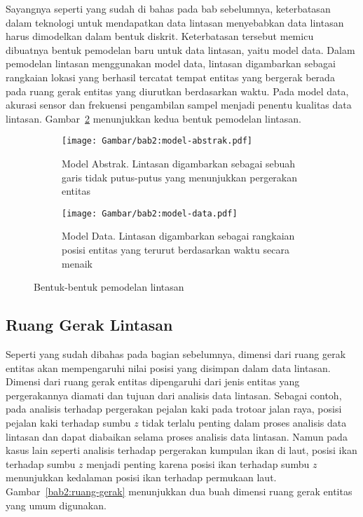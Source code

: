 Sayangnya seperti yang sudah di bahas pada bab sebelumnya, keterbatasan dalam teknologi untuk mendapatkan data lintasan menyebabkan data lintasan harus dimodelkan dalam bentuk diskrit. Keterbatasan tersebut memicu dibuatnya bentuk pemodelan baru untuk data lintasan, yaitu model data. Dalam pemodelan lintasan menggunakan model data, lintasan digambarkan sebagai rangkaian lokasi yang berhasil tercatat tempat entitas yang bergerak berada pada ruang gerak entitas yang diurutkan berdasarkan waktu. Pada model data, akurasi sensor dan frekuensi pengambilan sampel menjadi penentu kualitas data lintasan. Gambar~\ref{bab2:pemodelan-lintasan} menunjukkan kedua bentuk pemodelan lintasan.

\iffalse 

\lionov{kasih jarak antara gambar kiri dan kanan}.

\fi

\begin{figure}[t]
    \centering
    \begin{subfigure}[b]{0.375\textwidth}
        \centering
        \texttt{[image: Gambar/bab2:model-abstrak.pdf]}
        \caption{Model Abstrak. Lintasan digambarkan sebagai sebuah garis tidak putus-putus yang menunjukkan pergerakan entitas}
        \label{bab2:model-abstrak}
    \end{subfigure} \hspace{1.25cm}
    \begin{subfigure}[b]{0.375\textwidth}
        \centering
        \texttt{[image: Gambar/bab2:model-data.pdf]}
        \caption{Model Data. Lintasan digambarkan sebagai rangkaian posisi entitas yang terurut berdasarkan waktu secara menaik}
    \end{subfigure}
    \caption{Bentuk-bentuk pemodelan lintasan}
    \label{bab2:pemodelan-lintasan}
\end{figure}

\subsection{Ruang Gerak Lintasan}
\label{subsec:ruang}

Seperti yang sudah dibahas pada bagian sebelumnya, dimensi dari ruang gerak entitas akan mempengaruhi nilai posisi yang disimpan dalam data lintasan. Dimensi dari ruang gerak entitas dipengaruhi dari jenis entitas yang pergerakannya diamati dan tujuan dari analisis data lintasan. Sebagai contoh, pada analisis terhadap pergerakan pejalan kaki pada trotoar jalan raya, posisi pejalan kaki terhadap sumbu $z$ tidak terlalu penting dalam proses analisis data lintasan dan dapat diabaikan selama proses analisis data lintasan. Namun pada kasus lain seperti analisis terhadap pergerakan kumpulan ikan di laut, posisi ikan terhadap sumbu $z$ menjadi penting karena posisi ikan terhadap sumbu $z$ menunjukkan kedalaman posisi ikan terhadap permukaan laut. Gambar~\ref{bab2:ruang-gerak} menunjukkan dua buah dimensi ruang gerak entitas yang umum digunakan.


